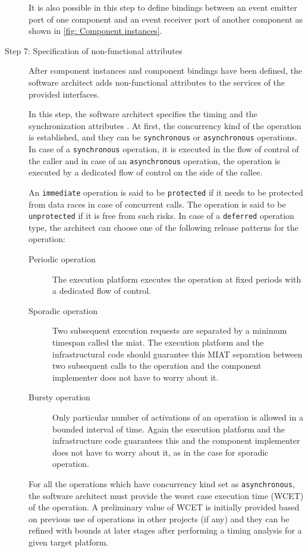 \begin{description}
It is also possible in this step to define bindings between an event emitter port of one component and an event receiver port of another component as shown in \cref{fig: Component instances}.

\item [Step 7: Specification of non-functional attributes] After component instances and component bindings have been defined, the software architect adds non-functional attributes to the services of the provided interfaces. 

In this step, the software architect specifies the timing and the synchronization attributes \cite{CompBasedProcess}. At first, the concurrency kind of the operation is established, and they can be \texttt{synchronous} or \texttt{asynchronous} operations. In case of a \texttt{synchronous} operation, it is executed in the flow of control of the caller and in case of an \texttt{asynchronous} operation, the operation is executed by a dedicated flow of control on the side of the callee. 

An \texttt{immediate} operation is said to be \texttt{protected} if it needs to be protected from data races in case of concurrent calls. The operation is said to be \texttt{unprotected} if it is free from such risks. In case of a \texttt{deferred} operation type, the architect can choose one of the following release patterns for the operation:

\begin{description}
\item [Periodic operation] The execution platform executes the operation at fixed periods with a dedicated flow of control.
\item [Sporadic operation] Two subsequent execution requests are separated by a minimum timespan called the \ac{miat}. The execution platform and the infrastructural code should guarantee this MIAT separation between two subsequent calls to the operation and the component implementer does not have to worry about it.
\item [Bursty operation] Only particular number of activations of an operation is allowed in a bounded interval of time. Again the execution platform and the infrastructure code guarantees this and the component implementer does not have to worry about it, as in the case for sporadic operation.
\end{description} 

For all the operations which have concurrency kind set as \texttt{asynchronous}, the software architect must provide the worst case execution time (WCET) of the operation. A preliminary value of WCET is initially provided based on previous use of operations in other projects (if any) and they can be refined with bounds at later stages after performing a timing analysis for a given target platform.


\end{description}
